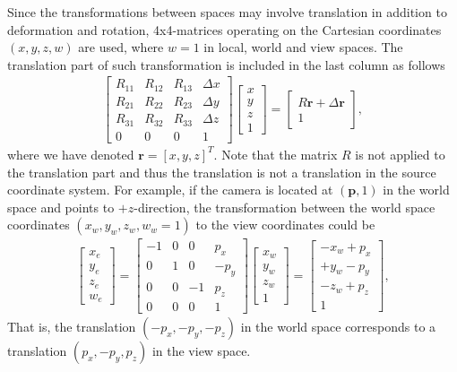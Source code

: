 \documentclass [12pt, a4paper] {article}
\newcommand{\vc}[1]
{
	\boldsymbol{#1}
}
\begin{document}
Since the transformations between spaces may involve translation in addition to deformation and 
rotation, 4x4-matrices operating on the Cartesian coordinates $(x,y,z,w)$ are used, where 
$w=1$ in local, world and view spaces. The translation part of such transformation is 
included in the last column as follows 
\begin {eqnarray}
    \begin {bmatrix}
        R_{11} & R_{12} & R_{13} & \Delta x \\
        R_{21} & R_{22} & R_{23} & \Delta y \\
        R_{31} & R_{32} & R_{33} & \Delta z \\
        0 & 0 & 0 & 1 
    \end {bmatrix}
    \begin {bmatrix}
        x \\ y \\ z \\ 1
    \end {bmatrix}
    = 
    \begin {bmatrix}
        R\vc r + \Delta\vc r \\ 1
    \end {bmatrix},
\end {eqnarray}
where we have denoted $\vc r = [x, y, z]^T$. Note that the matrix $R$ is not applied to 
the translation part and thus the translation is not a translation in the source coordinate system.
For example, if the camera is located at $(\vc p, 1)$ 
in the world space and points to $+z$-direction, the transformation between the world space 
coordinates $(x_w, y_w, z_w, w_w=1)$ to the view coordinates could be
\begin {eqnarray}
    \begin {bmatrix}
        x_e \\ y_e \\ z_e \\ w_e
    \end {bmatrix}
    = 
    \begin {bmatrix}
        -1 & 0 & 0 & p_x \\
        0 & 1 & 0 & -p_y \\
        0 & 0 & -1 & p_z \\
        0 & 0 & 0 & 1 
    \end {bmatrix}
    \begin {bmatrix}
        x_w \\ y_w \\ z_w \\ 1
    \end {bmatrix}
    = 
    \begin {bmatrix}
        -x_w + p_x \\ +y_w - p_y \\ -z_w + p_z \\ 1
    \end {bmatrix},
\end {eqnarray}
That is, the translation $(-p_x, -p_y, -p_z)$ in the world space corresponds to a translation 
$(p_x, -p_y, p_z)$ in the view space.
\end{document}
